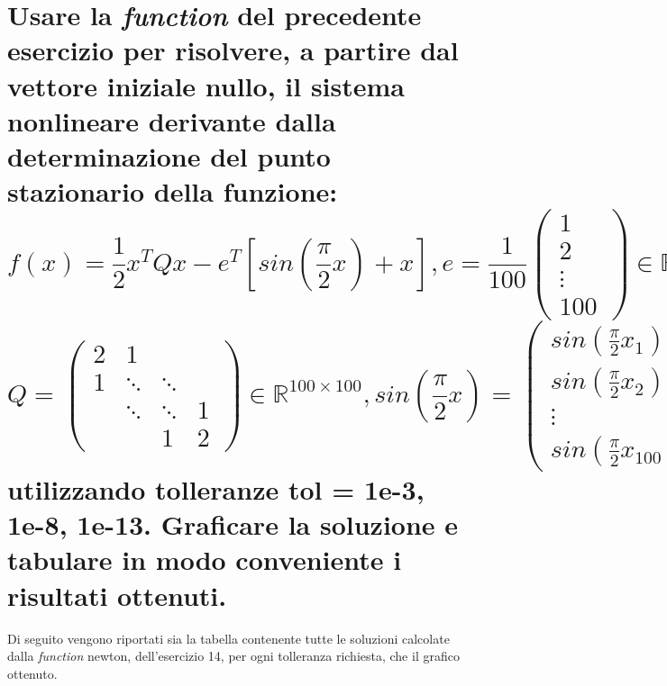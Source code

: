 \documentclass[10pt,a4paper]{article}
\begin{document}
\section{Usare la \textit{function} del precedente esercizio per risolvere, a partire
dal vettore iniziale nullo, il sistema nonlineare derivante dalla determinazione
del punto stazionario della funzione:
\[ f(x) = \frac{1}{2}x^TQx-e^T[sin(\frac{\pi}{2}x)+x],
  e = \frac{1}{100}
  \begin{pmatrix}
    1      \\
    2      \\
    \vdots \\
    100
  \end{pmatrix} \in \mathbb{R}^{100},
\]
\[
  Q =
  \begin{pmatrix}
    2 & 1                   \\
    1 & \ddots & \ddots     \\
      & \ddots & \ddots & 1 \\
      &        & 1      & 2
  \end{pmatrix} \in \mathbb{R}^{100 \times 100},
  sin(\frac{\pi}{2}x) =
  \begin{pmatrix}
    sin(\frac{\pi}{2}x_1) \\
    sin(\frac{\pi}{2}x_2) \\
    \vdots                \\
    sin(\frac{\pi}{2}x_{100}).
  \end{pmatrix}
\]
utilizzando tolleranze \textbf{tol = 1e-3, 1e-8, 1e-13.} Graficare la soluzione e tabulare in modo conveniente i risultati ottenuti.
}

Di seguito vengono riportati sia la tabella contenente tutte le
soluzioni calcolate dalla \textit{function} newton,
dell'esercizio 14, per ogni tolleranza richiesta, che 
il grafico ottenuto.
\end{document}
